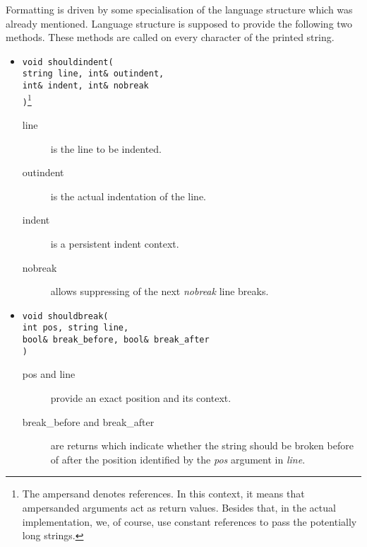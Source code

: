 Formatting is driven by some specialisation of the language structure which was already mentioned. Language structure is supposed to provide the following two methods. These methods are called on every character of the printed string.
\begin{itemize}
  \item \texttt{void shouldindent(\\  string line, int\& outindent, \\  int\& indent, int\& nobreak\\)}\footnote{The ampersand denotes references. In this context, it means that ampersanded arguments act as return values. Besides that, in the actual implementation, we, of course, use constant references to pass the potentially long strings.}
	\begin{description}
	  \item[line] is the line to be indented. 
	  \item[outindent] is the actual indentation of the line.
	  \item[indent] is a persistent indent context.
	  \item[nobreak] allows suppressing of the next \emph{nobreak} line breaks.
	\end{description}
  \item \texttt{void shouldbreak(\\  int pos, string line, \\  bool\& break\_before, bool\& break\_after\\)}
	\begin{description}
	  \item[pos and line] provide an exact position and its context.
	  \item[break\_before and break\_after] are returns which indicate whether the string should be broken before of after the position identified by the \emph{pos} argument in \emph{line}.
	\end{description}
\end{itemize}



